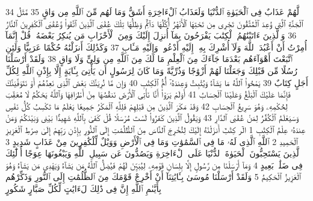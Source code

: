 {\tiny\colorbox{cl_aya}{34}} لَّهُمْ عَذَابٌ فِى ٱلْحَيَوٰةِ ٱلدُّنْيَا وَلَعَذَابُ ٱلْءَاخِرَةِ أَشَقُّ وَمَا لَهُم مِّنَ ٱللَّهِ مِن وَاقٍ
{\tiny\colorbox{cl_aya}{35}} مَّثَلُ ٱلْجَنَّةِ ٱلَّتِى وُعِدَ ٱلْمُتَّقُونَ تَجْرِى مِن تَحْتِهَا ٱلْأَنْهَٰرُ أُكُلُهَا دَآئِمٌ وَظِلُّهَا تِلْكَ عُقْبَى ٱلَّذِينَ ٱتَّقَوا۟ وَّعُقْبَى ٱلْكَٰفِرِينَ ٱلنَّارُ
{\tiny\colorbox{cl_aya}{36}} وَٱلَّذِينَ ءَاتَيْنَٰهُمُ ٱلْكِتَٰبَ يَفْرَحُونَ بِمَآ أُنزِلَ إِلَيْكَ وَمِنَ ٱلْأَحْزَابِ مَن يُنكِرُ بَعْضَهُۥ قُلْ إِنَّمَآ أُمِرْتُ أَنْ أَعْبُدَ ٱللَّهَ وَلَآ أُشْرِكَ بِهِۦٓ إِلَيْهِ أَدْعُوا۟ وَإِلَيْهِ مَـَٔابِ
{\tiny\colorbox{cl_aya}{37}} وَكَذَٰلِكَ أَنزَلْنَٰهُ حُكْمًا عَرَبِيًّا وَلَئِنِ ٱتَّبَعْتَ أَهْوَآءَهُم بَعْدَمَا جَآءَكَ مِنَ ٱلْعِلْمِ مَا لَكَ مِنَ ٱللَّهِ مِن وَلِىٍّ وَلَا وَاقٍ
{\tiny\colorbox{cl_aya}{38}} وَلَقَدْ أَرْسَلْنَا رُسُلًا مِّن قَبْلِكَ وَجَعَلْنَا لَهُمْ أَزْوَٰجًا وَذُرِّيَّةً وَمَا كَانَ لِرَسُولٍ أَن يَأْتِىَ بِـَٔايَةٍ إِلَّا بِإِذْنِ ٱللَّهِ لِكُلِّ أَجَلٍ كِتَابٌ
{\tiny\colorbox{cl_aya}{39}} يَمْحُوا۟ ٱللَّهُ مَا يَشَآءُ وَيُثْبِتُ وَعِندَهُۥٓ أُمُّ ٱلْكِتَٰبِ
{\tiny\colorbox{cl_aya}{40}} وَإِن مَّا نُرِيَنَّكَ بَعْضَ ٱلَّذِى نَعِدُهُمْ أَوْ نَتَوَفَّيَنَّكَ فَإِنَّمَا عَلَيْكَ ٱلْبَلَٰغُ وَعَلَيْنَا ٱلْحِسَابُ
{\tiny\colorbox{cl_aya}{41}} أَوَلَمْ يَرَوْا۟ أَنَّا نَأْتِى ٱلْأَرْضَ نَنقُصُهَا مِنْ أَطْرَافِهَا وَٱللَّهُ يَحْكُمُ لَا مُعَقِّبَ لِحُكْمِهِۦ وَهُوَ سَرِيعُ ٱلْحِسَابِ
{\tiny\colorbox{cl_aya}{42}} وَقَدْ مَكَرَ ٱلَّذِينَ مِن قَبْلِهِمْ فَلِلَّهِ ٱلْمَكْرُ جَمِيعًا يَعْلَمُ مَا تَكْسِبُ كُلُّ نَفْسٍ وَسَيَعْلَمُ ٱلْكُفَّٰرُ لِمَنْ عُقْبَى ٱلدَّارِ
{\tiny\colorbox{cl_aya}{43}} وَيَقُولُ ٱلَّذِينَ كَفَرُوا۟ لَسْتَ مُرْسَلًا قُلْ كَفَىٰ بِٱللَّهِ شَهِيدًۢا بَيْنِى وَبَيْنَكُمْ وَمَنْ عِندَهُۥ عِلْمُ ٱلْكِتَٰبِ
{\tiny\colorbox{cl_aya}{1}} الٓر كِتَٰبٌ أَنزَلْنَٰهُ إِلَيْكَ لِتُخْرِجَ ٱلنَّاسَ مِنَ ٱلظُّلُمَٰتِ إِلَى ٱلنُّورِ بِإِذْنِ رَبِّهِمْ إِلَىٰ صِرَٰطِ ٱلْعَزِيزِ ٱلْحَمِيدِ
{\tiny\colorbox{cl_aya}{2}} ٱللَّهِ ٱلَّذِى لَهُۥ مَا فِى ٱلسَّمَٰوَٰتِ وَمَا فِى ٱلْأَرْضِ وَوَيْلٌ لِّلْكَٰفِرِينَ مِنْ عَذَابٍ شَدِيدٍ
{\tiny\colorbox{cl_aya}{3}} ٱلَّذِينَ يَسْتَحِبُّونَ ٱلْحَيَوٰةَ ٱلدُّنْيَا عَلَى ٱلْءَاخِرَةِ وَيَصُدُّونَ عَن سَبِيلِ ٱللَّهِ وَيَبْغُونَهَا عِوَجًا أُو۟لَٰٓئِكَ فِى ضَلَٰلٍۭ بَعِيدٍ
{\tiny\colorbox{cl_aya}{4}} وَمَآ أَرْسَلْنَا مِن رَّسُولٍ إِلَّا بِلِسَانِ قَوْمِهِۦ لِيُبَيِّنَ لَهُمْ فَيُضِلُّ ٱللَّهُ مَن يَشَآءُ وَيَهْدِى مَن يَشَآءُ وَهُوَ ٱلْعَزِيزُ ٱلْحَكِيمُ
{\tiny\colorbox{cl_aya}{5}} وَلَقَدْ أَرْسَلْنَا مُوسَىٰ بِـَٔايَٰتِنَآ أَنْ أَخْرِجْ قَوْمَكَ مِنَ ٱلظُّلُمَٰتِ إِلَى ٱلنُّورِ وَذَكِّرْهُم بِأَيَّىٰمِ ٱللَّهِ إِنَّ فِى ذَٰلِكَ لَءَايَٰتٍ لِّكُلِّ صَبَّارٍ شَكُورٍ
